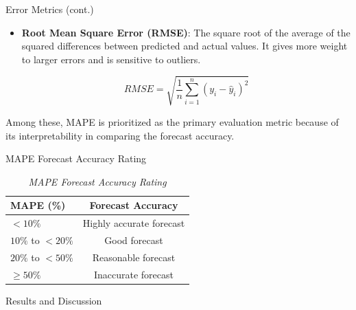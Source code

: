 \documentclass[12pt, aspectratio=169]{beamer}
\begin{document}
\begin{frame}{Error Metrics (cont.)}
\begin{itemize}
    \item \textbf{Root Mean Square Error (RMSE)}: The square root of the average of the squared differences between predicted and actual values. It gives more weight to larger errors and is sensitive to outliers.
    
    $$
        RMSE = \sqrt{\frac{1}{n} \sum_{i=1}^{n} (y_{i} - \hat{y}_{i})^{2}}  
    $$
\end{itemize} 

Among these, MAPE is prioritized as the primary evaluation metric because of its interpretability in comparing the forecast accuracy. 
\end{frame}

\begin{frame}{MAPE Forecast Accuracy Rating}
\begin{table}
    \caption{\textit{MAPE Forecast Accuracy Rating}}
    \label{lewis}
    \centering
    \begin{tabular}{lc}
        \toprule
        MAPE (\%) & Forecast Accuracy \\
        \midrule
        $< 10\%$ & Highly accurate forecast \\
        $10\%$ to $<20\%$ & Good forecast \\
        $20\%$ to $< 50\%$ & Reasonable forecast \\
        $\ge 50\%$ & Inaccurate forecast \\
        \bottomrule
    \end{tabular}
\end{table}
\end{frame}

\begin{frame}
    \begin{tcolorbox}[colframe=theme, colback=theme]
        \begin{center}
            \Huge{Results and Discussion}
        \end{center}
    \end{tcolorbox}
\end{frame}
\end{document}
